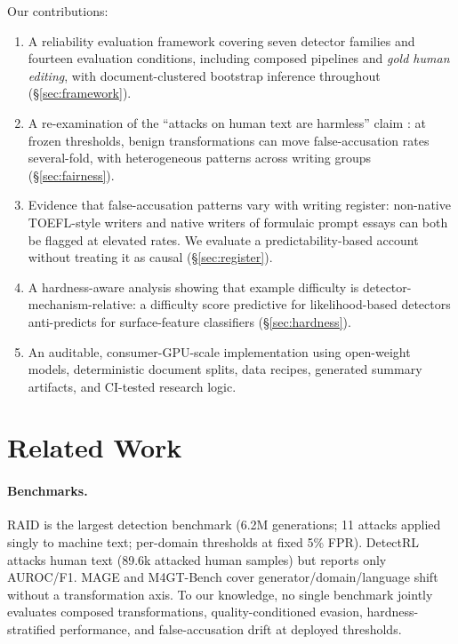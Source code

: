 \documentclass[11pt]{article}
\begin{document}
\noindent Our contributions:
\begin{enumerate}
  \item A reliability evaluation framework covering seven detector families
        and fourteen evaluation conditions, including
        composed pipelines and \emph{gold human editing}, with
        document-clustered bootstrap inference throughout (\S\ref{sec:framework}).
  \item A re-examination of the ``attacks on human text are harmless'' claim
        \citep{wu2024detectrl}: at frozen thresholds, benign transformations
        can move false-accusation rates several-fold, with heterogeneous
        patterns across writing groups (\S\ref{sec:fairness}).
  \item Evidence that false-accusation patterns vary with writing register:
        non-native TOEFL-style writers and native writers of formulaic prompt
        essays can both be flagged at elevated rates. We evaluate a
        predictability-based account without treating it as causal
        (\S\ref{sec:register}).
  \item A hardness-aware analysis showing that example difficulty is
        detector-mechanism-relative: a difficulty score predictive for
        likelihood-based detectors anti-predicts for surface-feature
        classifiers (\S\ref{sec:hardness}).
  \item An auditable, consumer-GPU-scale implementation using open-weight
        models, deterministic document splits, data recipes, generated summary
        artifacts, and CI-tested research logic.
\end{enumerate}

\section{Related Work}
\label{sec:related}

\paragraph{Benchmarks.} RAID \citep{dugan2024raid} is the largest detection
benchmark (6.2M generations; 11 attacks applied singly to machine text;
per-domain thresholds at fixed 5\% FPR). DetectRL \citep{wu2024detectrl}
attacks human text (89.6k attacked human samples) but reports only AUROC/F1.
MAGE \citep{li2024mage} and M4GT-Bench \citep{wang2024m4gt} cover
generator/domain/language shift without a transformation axis. To our
knowledge, no single benchmark jointly evaluates composed transformations,
quality-conditioned evasion, hardness-stratified performance, and
false-accusation drift at deployed thresholds.
\end{document}
